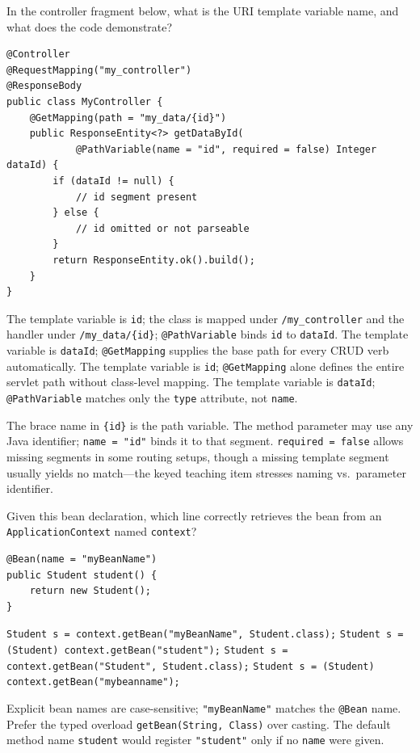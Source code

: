 \question[4]
In the controller fragment below, what is the URI template variable name, and what does the code demonstrate?
\begin{lstlisting}[style=java]
@Controller
@RequestMapping("my_controller")
@ResponseBody
public class MyController {
    @GetMapping(path = "my_data/{id}")
    public ResponseEntity<?> getDataById(
            @PathVariable(name = "id", required = false) Integer dataId) {
        if (dataId != null) {
            // id segment present
        } else {
            // id omitted or not parseable
        }
        return ResponseEntity.ok().build();
    }
}
\end{lstlisting}
\begin{choices}
  \CorrectChoice The template variable is \texttt{id}; the class is mapped under \texttt{/my\_controller} and the handler under \texttt{/my\_data/\{id\}}; \texttt{@PathVariable} binds \texttt{id} to \texttt{dataId}.
  \choice The template variable is \texttt{dataId}; \texttt{@GetMapping} supplies the base path for every CRUD verb automatically.
  \choice The template variable is \texttt{id}; \texttt{@GetMapping} alone defines the entire servlet path without class-level mapping.
  \choice The template variable is \texttt{dataId}; \texttt{@PathVariable} matches only the \texttt{type} attribute, not \texttt{name}.
\end{choices}
\begin{solution}
  The brace name in \texttt{\{id\}} is the path variable. The method parameter may use any Java identifier; \texttt{name = "id"} binds it to that segment. \texttt{required = false} allows missing segments in some routing setups, though a missing template segment usually yields no match---the keyed teaching item stresses naming vs.\ parameter identifier.
\end{solution}

\question[4]
Given this bean declaration, which line correctly retrieves the bean from an \texttt{ApplicationContext} named \texttt{context}?
\begin{lstlisting}[style=java]
@Bean(name = "myBeanName")
public Student student() {
    return new Student();
}
\end{lstlisting}
\begin{choices}
  \CorrectChoice \texttt{Student s = context.getBean("myBeanName", Student.class);}
  \choice \texttt{Student s = (Student) context.getBean("student");}
  \choice \texttt{Student s = context.getBean("Student", Student.class);}
  \choice \texttt{Student s = (Student) context.getBean("mybeanname");}
\end{choices}
\begin{solution}
  Explicit bean names are case-sensitive; \texttt{"myBeanName"} matches the \texttt{@Bean} name. Prefer the typed overload \texttt{getBean(String, Class)} over casting. The default method name \texttt{student} would register \texttt{"student"} only if no \texttt{name} were given.
\end{solution}


